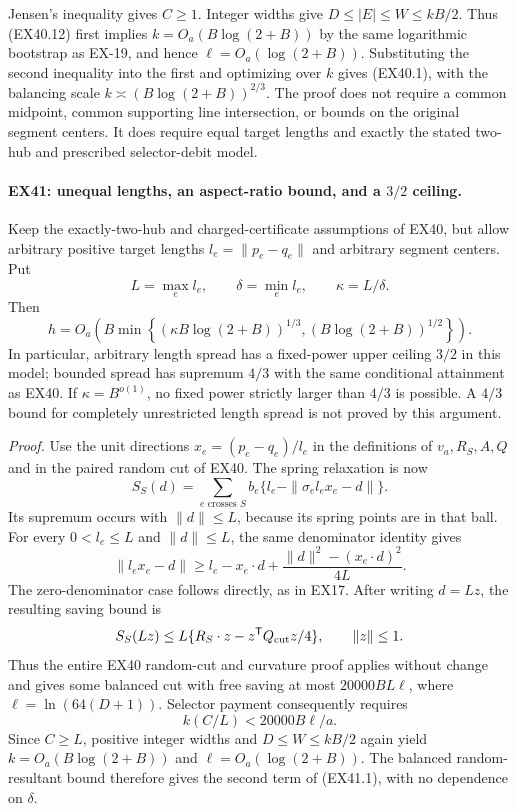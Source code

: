 Jensen's inequality gives $C\ge1$. Integer widths give
$D\le |E|\le W\le kB/2$. Thus (EX40.12) first implies
$k=O_a(B\log(2+B))$ by the same logarithmic bootstrap as
EX-19, and hence $\ell=O_a(\log(2+B))$. Substituting the
second inequality into the first and optimizing over $k$
gives (EX40.1), with the balancing scale
$k\asymp(B\log(2+B))^{2/3}$.
The proof does not require a common midpoint, common supporting
line intersection, or bounds on the original segment centers.
It does require equal target lengths and exactly the stated
two-hub and prescribed selector-debit model.


\paragraph{EX41: unequal lengths, an aspect-ratio bound, and a $3/2$ ceiling.}
Keep the exactly-two-hub and charged-certificate assumptions of EX40,
but allow arbitrary positive target lengths $l_e=\|p_e-q_e\|$ and
arbitrary segment centers. Put
\[
 L=\max_e l_e,\qquad \delta=\min_e l_e,\qquad \kappa=L/\delta.
\]
Then
\[
 h=O_a\!\left(
 B\min\left\{
       (\kappa B\log(2+B))^{1/3},
       (B\log(2+B))^{1/2}
       \right\}\right).
 \tag{EX41.1}
\]
In particular, arbitrary length spread has a fixed-power upper ceiling
$3/2$ in this model; bounded spread has supremum $4/3$ with the same
conditional attainment as EX40. If $\kappa=B^{o(1)}$, no fixed power
strictly larger than $4/3$ is possible. A $4/3$ bound for completely
unrestricted length spread is not proved by this argument.

\emph{Proof.}
Use the unit directions $x_e=(p_e-q_e)/l_e$ in the definitions
of $v_a,R_S,A,Q$ and in the paired random cut of EX40.
The spring relaxation is now
\[
 S_S(d)=\sum_{e\text{ crosses }S}
 b_e\{l_e-\|\sigma_e l_ex_e-d\|\}.
\]
Its supremum occurs with $\|d\|\le L$, because its spring points
are in that ball. For every $0<l_e\le L$ and $\|d\|\le L$,
the same denominator identity gives
\[
 \|l_ex_e-d\|
 \ge l_e-x_e\cdot d+
      \frac{\|d\|^2-(x_e\cdot d)^2}{4L}.
\]
The zero-denominator case follows directly, as in EX17.
After writing $d=Lz$, the resulting saving bound is
\[
 S_S(Lz)\le L\{R_S\cdot z-z^{\mathsf T}Q_{\rm cut}z/4\},
 \qquad \|z\|\le1.
\]
Thus the entire EX40 random-cut and curvature proof applies
without change and gives some balanced cut with free saving at
most $20000BL\ell$, where $\ell=\ln(64(D+1))$.
Selector payment consequently requires
\[
                  k(C/L)<20000B\ell/a.
 \tag{EX41.2}
\]
Since $C\ge L$, positive integer widths and
$D\le W\le kB/2$ again yield
$k=O_a(B\log(2+B))$ and $\ell=O_a(\log(2+B))$.
The balanced random-resultant bound therefore gives the second
term of (EX41.1), with no dependence on $\delta$.

